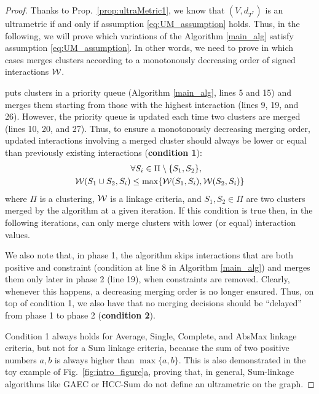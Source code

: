 \secondUltraMetricProperty*
\begin{proof}
Thanks to Prop.~\ref{prop:ultraMetric1}, we know that $(V, d_{T^*})$ is an ultrametric if and only if assumption \ref{eq:UM_assumption} holds. Thus, in the following, we will prove which variations of the \algname{} Algorithm \ref{main_alg} satisfy assumption \ref{eq:UM_assumption}. 
In other words, we need to prove in which cases \algname{} merges clusters according to a monotonously decreasing order of signed interactions $\mathcal{W}{}$.

\algname{} puts clusters in a priority queue (Algorithm \ref{main_alg}, lines 5 and 15) and merges them starting from those with the highest interaction (lines 9, 19, and 26). However, the priority queue is updated each time two clusters are merged (lines 10, 20, and 27). Thus, to ensure a monotonously decreasing merging order, updated interactions involving a merged cluster should always be lower or equal than previously existing interactions (\textbf{condition 1}):
\begin{align}\label{eq:condition1}
& \forall S_i \in \Pi \setminus \{S_1, S_2\}, \nonumber \\
\mathcal{W}{}(S_1 \cup S_2, S_i) &\leq \max \{ \mathcal{W}{}(S_1, S_i), \mathcal{W}{}(S_2, S_i)\} 
\end{align}
where $\Pi$ is a clustering, $\mathcal{W}{}$ is a linkage criteria, and $S_1,S_2\in \Pi$ are two clusters merged by the algorithm at a given iteration. If this condition is true then, in the following iterations, \algname{} can only merge clusters with lower (or equal) interaction values. 

We also note that, in phase 1, the algorithm skips interactions that are both positive and constraint (condition at line 8 in Algorithm \ref{main_alg}) and merges them only later in phase 2 (line 19), when constraints are removed.
Clearly, whenever this happens, a decreasing merging order is no longer ensured. 
Thus, on top of condition 1, we also have that no merging decisions should be ``delayed'' from phase 1 to phase 2 (\textbf{condition 2}). 

Condition 1 always holds for Average, Single, Complete, and AbsMax linkage criteria, but not for a Sum linkage criteria, because the sum of two positive numbers $a,b$ is always higher than $\max\{a,b\}$. This is also demonstrated in the toy example of Fig.~\hyperref[fig:intro_figure]{\ref*{fig:intro_figure}a}, proving that, in general, Sum-linkage algorithms like GAEC or HCC-Sum do not define an ultrametric on the graph.


\end{proof}
